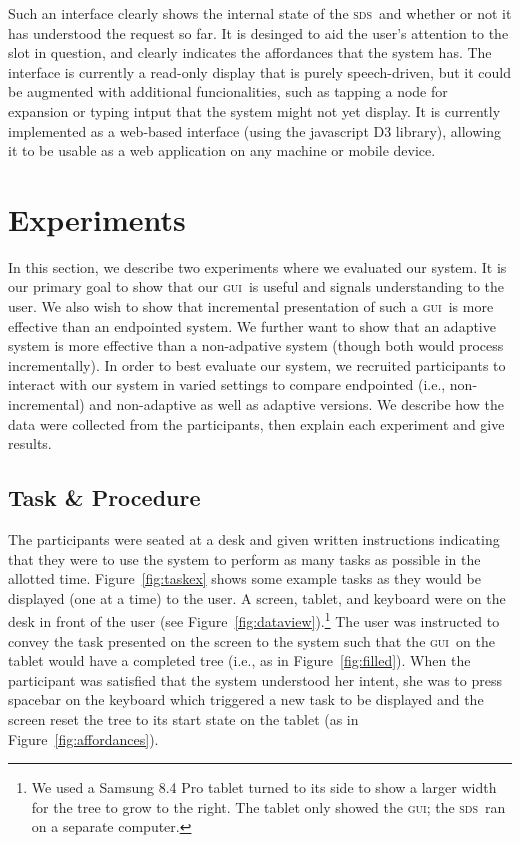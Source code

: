 \documentclass[11pt]{article}
\newcommand{\sds}[0]{\textsc{sds}}
\newcommand{\ui}[0]{\textsc{gui}}
\begin{document}
Such an interface clearly shows the internal state of the \sds\ and whether or not it has understood the request so far. It is desinged to aid the user's attention to the slot in question, and clearly indicates the affordances that the system has. The interface is currently a read-only display that is purely speech-driven, but it could be augmented with additional funcionalities, such as tapping a node for expansion or typing intput that the system might not yet display. It is currently implemented as a web-based interface (using the javascript D3 library), allowing it to be usable as a web application on any machine or mobile device. 


\section{Experiments}
\label{section:experiments}

In this section, we describe two experiments where we evaluated our system. It is our primary goal to show that our \ui\ is useful and signals understanding to the user. We also wish to show that incremental presentation of such a \ui\ is more effective than an endpointed system. We further want to show that an adaptive system is more effective than a non-adpative system (though both would process incrementally). In order to best evaluate our system, we recruited participants to interact with our system in varied settings to compare endpointed (i.e., non-incremental) and non-adaptive as well as adaptive versions. We describe how the data were collected from the participants, then explain each experiment and give results.

\subsection{Task \& Procedure} 



The participants were seated at a desk and given written instructions indicating that they were to use the system to perform as many tasks as possible in the allotted time. Figure~\ref{fig:taskex} shows some example tasks as they would be displayed (one at a time) to the user. A screen, tablet, and keyboard were on the desk in front of the user (see Figure~\ref{fig:dataview}).\footnote{We used a Samsung 8.4 Pro tablet turned to its side to show a larger width for the tree to grow to the right. The tablet only showed the \ui; the \sds\ ran on a separate computer.}  The user was instructed to convey the task presented on the screen to the system such that the \ui\ on the tablet would have a completed tree (i.e., as in Figure~\ref{fig:filled}). When the participant was satisfied that the system understood her intent, she was to press spacebar on the keyboard which triggered a new task to be displayed and the screen reset the tree to its start state on the tablet (as in Figure~\ref{fig:affordances}). 
\end{document}
